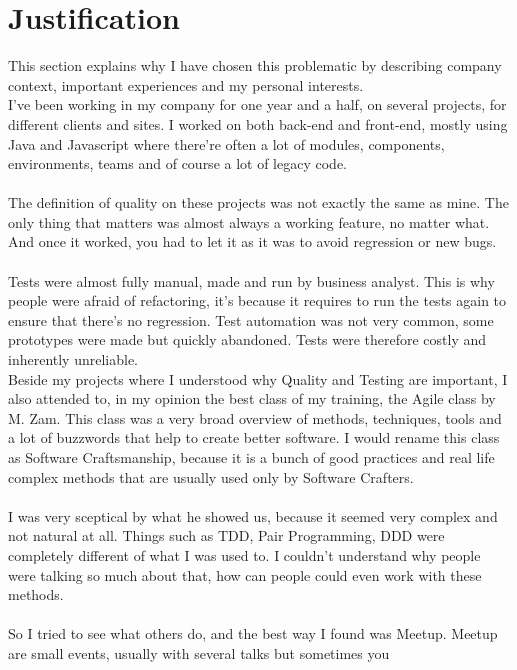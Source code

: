 \section{Justification}\label{sec:justification}
This section explains why I have chosen this problematic by describing
company context, important experiences and my personal interests. \\
I've been working in my company for one year and a half, on several
projects, for different clients and sites.
I worked on both back-end and front-end, mostly using Java and Javascript where
there're often a lot of modules, components, environments, teams and of course
a lot of legacy code. \\ \\
The definition of quality on these projects was not exactly the same as mine.
The only thing that matters was almost always a working feature, no matter
what.
And once it worked, you had to let it as it was to avoid regression or new
bugs. \\ \\
Tests were almost fully manual, made and run by business analyst.
This is why people were afraid of refactoring, it's because it requires to
run the tests again to ensure that there's no regression.
Test automation was not very common, some prototypes were made but quickly
abandoned.
Tests were therefore costly and inherently unreliable. \\
\newline
Beside my projects where I understood why Quality and Testing are
important, I also attended to, in my opinion the best class of my
training, the Agile class by M. Zam.
This class was a very broad overview of methods, techniques, tools and a
lot of buzzwords that help to create better software.
I would rename this class as Software Craftsmanship, because it is a
bunch of good practices and real life complex methods that are usually
used only by Software Crafters. \\ \\
I was very sceptical by what he showed us, because it seemed very complex
and not natural at all.
Things such as TDD, Pair Programming, DDD were completely different of
what I was used to.
I couldn't understand why people were talking so much about that, how can
people could even work with these methods. \\ \\
So I tried to see what others do, and the best way I found was Meetup.
Meetup are small events, usually with several talks but sometimes you
